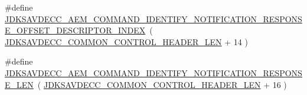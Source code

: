 \begin{DoxyCompactItemize}
\item 
\#define \hyperlink{group__command__identify__notification_ga3b2e8d99338ec429fbc64c56660b6c55}{J\+D\+K\+S\+A\+V\+D\+E\+C\+C\+\_\+\+A\+E\+M\+\_\+\+C\+O\+M\+M\+A\+N\+D\+\_\+\+I\+D\+E\+N\+T\+I\+F\+Y\+\_\+\+N\+O\+T\+I\+F\+I\+C\+A\+T\+I\+O\+N\+\_\+\+R\+E\+S\+P\+O\+N\+S\+E\+\_\+\+O\+F\+F\+S\+E\+T\+\_\+\+D\+E\+S\+C\+R\+I\+P\+T\+O\+R\+\_\+\+I\+N\+D\+EX}~( \hyperlink{group__jdksavdecc__avtp__common__control__header_gaae84052886fb1bb42f3bc5f85b741dff}{J\+D\+K\+S\+A\+V\+D\+E\+C\+C\+\_\+\+C\+O\+M\+M\+O\+N\+\_\+\+C\+O\+N\+T\+R\+O\+L\+\_\+\+H\+E\+A\+D\+E\+R\+\_\+\+L\+EN} + 14 )
\item 
\#define \hyperlink{group__command__identify__notification_gab7f2d949b16700833ee2c2c5af2062b9}{J\+D\+K\+S\+A\+V\+D\+E\+C\+C\+\_\+\+A\+E\+M\+\_\+\+C\+O\+M\+M\+A\+N\+D\+\_\+\+I\+D\+E\+N\+T\+I\+F\+Y\+\_\+\+N\+O\+T\+I\+F\+I\+C\+A\+T\+I\+O\+N\+\_\+\+R\+E\+S\+P\+O\+N\+S\+E\+\_\+\+L\+EN}~( \hyperlink{group__jdksavdecc__avtp__common__control__header_gaae84052886fb1bb42f3bc5f85b741dff}{J\+D\+K\+S\+A\+V\+D\+E\+C\+C\+\_\+\+C\+O\+M\+M\+O\+N\+\_\+\+C\+O\+N\+T\+R\+O\+L\+\_\+\+H\+E\+A\+D\+E\+R\+\_\+\+L\+EN} + 16 )
\end{DoxyCompactItemize}
